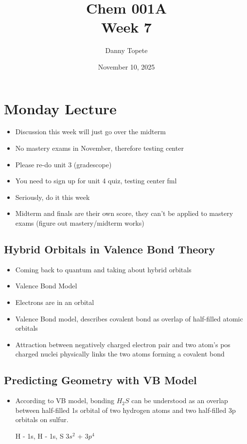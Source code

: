 \documentclass{article}
\title{Chem 001A\\ Week 7}
\author{Danny Topete}
\date{November 10, 2025}
\begin{document}
\maketitle

\section{Monday Lecture}

\begin{itemize}
  \item Discussion this week will just go over the midterm
  \item No mastery exams in November, therefore testing center
  \item Please re-do unit 3 (gradescope)
  \item You need to sign up for unit 4 quiz, testing center fml
  \item Seriously, do it this week
  \item Midterm and finals are their own score, they can't be applied
    to mastery exams (figure out mastery/midterm works)
\end{itemize}

\subsection{Hybrid Orbitals in Valence Bond Theory}
\begin{itemize}
  \item Coming back to quantum and taking about hybrid orbitals
  \item Valence Bond Model
  \item Electrons are in an orbital
  \item Valence Bond model, describes covalent bond as overlap of half-filled atomic orbitals
  \item Attraction between negatively charged electron pair and two atom's pos charged nuclei physically links the two atoms forming a
    covalent bond
\end{itemize}

\subsection{Predicting Geometry with VB Model}
\begin{itemize}
  \item According to VB model, bonding $H_2S$ can be understood as an overlap between
    half-filled 1s orbital of two hydrogen atoms and two half-filled 3p orbitals on sulfur.

   H - 1s, H - 1s, S $3s^2$ + $3p^4$
\end{itemize}
\end{document}
